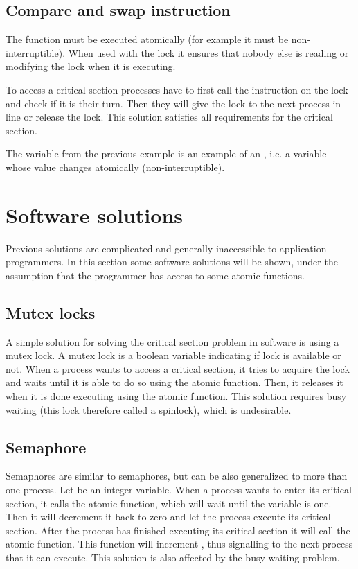 \subsection{Compare and swap instruction}
The  function must be executed atomically (for example it must be non-interruptible). When used with the lock it ensures that nobody else is reading or modifying the lock when it is executing.

To access a critical section processes have to first call the  instruction on the lock and check if it is their turn. Then they will give the lock to the next process in line or release the lock. 
This solution satisfies all requirements for the critical section.

The  variable from the previous example is an example of an , i.e. a variable whose value changes atomically (non-interruptible).

\section{Software solutions}
Previous solutions are complicated and generally inaccessible to application programmers. In this section some software solutions will be shown, under the assumption that the programmer has access to some atomic functions.

\subsection{Mutex locks}
A simple solution for solving the critical section problem in software is using a mutex lock. A mutex lock is a boolean variable indicating if lock is available or not. When a process wants to access a critical section, it tries to acquire the lock and waits until it is able to do so using the  atomic function. Then, it releases it when it is done executing using the  atomic function. This solution requires busy waiting (this lock therefore called a spinlock), which is undesirable.

\subsection{Semaphore}
Semaphores are similar to semaphores, but can be also generalized to more than one process. Let  be an integer variable. When a process wants to enter its critical section, it calls the  atomic function, which will wait until the  variable is one. Then it will decrement it back to zero and let the process execute its critical section. After the process has finished executing its critical section it will call the  atomic function. This function will increment , thus signalling to the next process that it can execute. This solution is also affected by the busy waiting problem.

